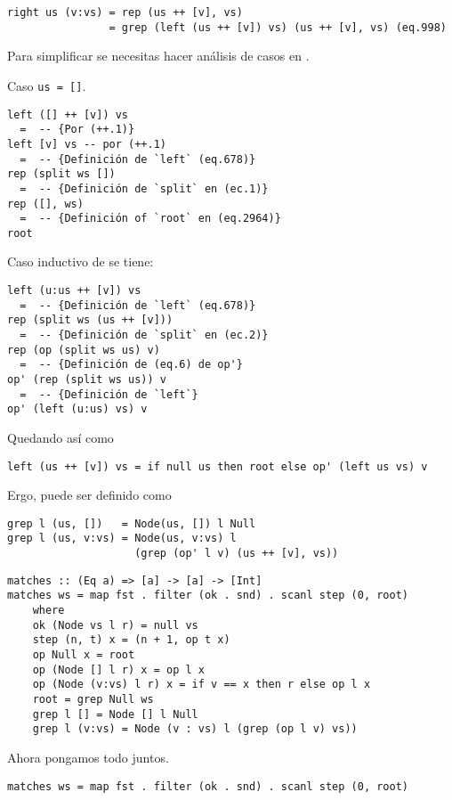 \begin{verbatim}
right us (v:vs) = rep (us ++ [v], vs)
                = grep (left (us ++ [v]) vs) (us ++ [v], vs) (eq.998)
\end{verbatim}

Para simplificar  se necesitas hacer análisis de casos en .

Caso \texttt{us = []}.
\begin{verbatim}
left ([] ++ [v]) vs
  =  -- {Por (++.1)}
left [v] vs -- por (++.1) 
  =  -- {Definición de `left` (eq.678)}
rep (split ws []) 
  =  -- {Definición de `split` en (ec.1)}
rep ([], ws)
  =  -- {Definición of `root` en (eq.2964)}
root
\end{verbatim}

Caso inductivo de  se tiene:
\begin{verbatim}
left (u:us ++ [v]) vs
  =  -- {Definición de `left` (eq.678)}
rep (split ws (us ++ [v]))
  =  -- {Definición de `split` en (ec.2)}
rep (op (split ws us) v)
  =  -- {Definición de (eq.6) de op'}
op' (rep (split ws us)) v
  =  -- {Definición de `left`}
op' (left (u:us) vs) v
\end{verbatim}

Quedando así  como
\begin{verbatim}
left (us ++ [v]) vs = if null us then root else op' (left us vs) v
\end{verbatim}

Ergo,  puede ser definido como
\begin{verbatim}
grep l (us, [])   = Node(us, []) l Null
grep l (us, v:vs) = Node(us, v:vs) l
                    (grep (op' l v) (us ++ [v], vs))
\end{verbatim}

\begin{verbatim}
matches :: (Eq a) => [a] -> [a] -> [Int]
matches ws = map fst . filter (ok . snd) . scanl step (0, root)
    where
    ok (Node vs l r) = null vs
    step (n, t) x = (n + 1, op t x)
    op Null x = root
    op (Node [] l r) x = op l x
    op (Node (v:vs) l r) x = if v == x then r else op l x
    root = grep Null ws
    grep l [] = Node [] l Null
    grep l (v:vs) = Node (v : vs) l (grep (op l v) vs))
\end{verbatim}

Ahora pongamos todo juntos.
\begin{verbatim}
matches ws = map fst . filter (ok . snd) . scanl step (0, root)
\end{verbatim}

